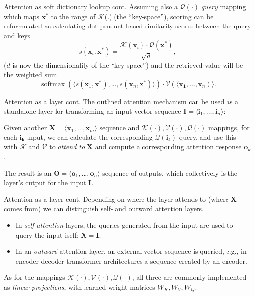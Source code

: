 \documentclass[style=upen, size=14pt]{powerdot}
\DeclareMathOperator*{\softmax}{softmax}
\newcommand{\gold}{\color{arany}}
\theoremstyle{definition}
\begin{document}
\begin{slide}[toc=]{Attention as soft dictionary lookup cont.}
  Assuming also a $\mathcal Q(\cdot)$ \emph{\gold query} mapping which maps
  $\mathbf{x}^*$ to the range of $\mathcal K$(.) (the ``key-space''), scoring
  can be reformulated as calculating dot-product based similarity scores between
  the query and keys
  $$
  s(\mathbf{x}_i, \mathbf{x}^*) = \frac{\mathcal K (\mathbf{x}_i)\cdot
    \mathcal Q (\mathbf{x}^*)}{\sqrt{d}},
  $$
  ($d$ is now the dimensionality of the ``key-space'') and the retrieved value
  will be the weighted sum
  $$
  \softmax(\langle
  s(\mathbf{x}_1,\mathbf{x}^*),\dots,s(\mathbf{x}_n,\mathbf{x}^*) \rangle)\cdot
  \mathcal V(\langle \mathbf{x_1},\dots,\mathbf{x}_n)\rangle.
  $$
\end{slide}

\begin{slide}[toc=Attention layer]{Attention as a layer cont.}
  The outlined attention mechanism can be used as a standalone layer for
  transforming an input vector sequence
  $\mathbf{I} = \langle \mathbf{i}_1,\dots, \mathbf{i}_n \rangle$:\bigskip

  Given another $\mathbf{X} = \langle \mathbf{x}_1,\dots, \mathbf{x}_m \rangle$
  sequence and $\mathcal K(\cdot),\mathcal V(\cdot),\mathcal Q(\cdot)$ mappings,
  for each $\mathbf{i_k}$ input, we can calculate the corresponding
  $\mathcal Q(\mathbf{i}_k)$ query, and use this with $\mathcal K$ and
  $\mathcal V$ to \emph{attend to} $\mathbf{X}$ and compute a corresponding
  attention response $\mathbf{o}_k$.\bigskip

  The result is an $\mathbf{O}=\langle \mathbf{o}_1,\dots,\mathbf{o}_n \rangle$
  sequence of outputs, which collectively is the layer's output for the input
  $\mathbf{I}$.
\end{slide}

\begin{slide}[toc=]{Attention as a layer cont.}
  Depending on where the layer attends to (where $\mathbf{X}$ comes from) we can
  distinguish self- and outward attention layers.
  \begin{itemize}
  \item In \emph{\gold self-attention} layers, the queries generated from the
    input are used to query the input iself: $\mathbf{X}=\mathbf{I}$.
  \item In an \emph{\gold outward} attention layer, an external vector sequence
    is queried, e.g., in encoder-decoder transformer architectures a sequence
    created by an encoder.
  \end{itemize}
  As for the mappings $\mathcal K(\cdot),\mathcal V(\cdot),\mathcal Q(\cdot)$,
  all three are commonly implemented as \emph{\gold linear projections}, with
  learned weight matrices $W_K, W_V, W_Q$.
\end{slide}
\end{document}
